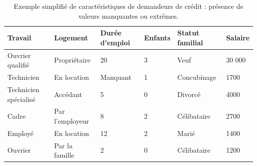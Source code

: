 
\begin{table}
\centering
\begin{tabular}{l|l|l|l|l|l}
Travail & Logement & Durée d'emploi & Enfants & Statut familial & Salaire \\
\hline
Ouvrier qualifié & Propriétaire & 20 & 3 & Veuf & 30 000  \\
Technicien & En location & Manquant & 1 & Concubinage & {1700}  \\
Technicien spécialisé & Accédant & 5 & 0 & Divorcé & {4000}  \\
Cadre & Par l'employeur & 8 & 2 & Célibataire & {2700}  \\
Employé & En location & 12 & 2 & Marié & {1400}  \\
Ouvrier & Par la famille & 2 & 0 & Célibataire & {1200}  \\
\end{tabular}
\caption{\label{tab:design} Exemple simplifié de caractéristiques de demandeurs de crédit : présence de valeurs manquantes ou extrêmes.}
\end{table}

